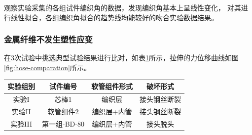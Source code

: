 观察实验采集的各组试件编织角的数据，发现编织角基本上呈线性变化， 对其进行线性拟合，各组编织角拟合的趋势线均能较好的吻合实验数据结果。




\subsubsection{金属纤维不发生塑性应变}



在3次试验中挑选典型试验结果进行比对，如表\ref{tab:hose-comparation}所示，拉伸的力位移曲线如图\ref{fig:hose-comparation}所示。

\begin{table}[!htb]
	\centering
	\label{tab:hose-comparation}
	\begin{tabular}{@{\extracolsep{\fill}}>{\hspace{0.5cm}}cccc}
		\toprule
		实验组别 & 试件编号& 软管组件形式& 破坏形式\\\midrule
		实验I& 芯棒1& 编织层& 接头钢丝断裂\\
		实验II& 软管组件2& 编织层+内管& 接头钢丝断裂\\
		实验III& 第一组-BD-80& 编织层+内管& 接头脱头\\\bottomrule
	\end{tabular} 
\end{table}  


